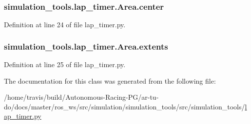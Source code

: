 \subsubsection[{\texorpdfstring{center}{center}}]{\setlength{\rightskip}{0pt plus 5cm}simulation\+\_\+tools.\+lap\+\_\+timer.\+Area.\+center}\hypertarget{classsimulation__tools_1_1lap__timer_1_1_area_ab6d54ce6f15f7931e2c97c418ef275ec}{}\label{classsimulation__tools_1_1lap__timer_1_1_area_ab6d54ce6f15f7931e2c97c418ef275ec}


Definition at line 24 of file lap\+\_\+timer.\+py.

\subsubsection[{\texorpdfstring{extents}{extents}}]{\setlength{\rightskip}{0pt plus 5cm}simulation\+\_\+tools.\+lap\+\_\+timer.\+Area.\+extents}\hypertarget{classsimulation__tools_1_1lap__timer_1_1_area_a5a876b3d7c79ddb803e0e66d851c8c4d}{}\label{classsimulation__tools_1_1lap__timer_1_1_area_a5a876b3d7c79ddb803e0e66d851c8c4d}


Definition at line 25 of file lap\+\_\+timer.\+py.



The documentation for this class was generated from the following file\+:\begin{DoxyCompactItemize}
\item 
/home/travis/build/\+Autonomous-\/\+Racing-\/\+P\+G/ar-\/tu-\/do/docs/master/ros\+\_\+ws/src/simulation/simulation\+\_\+tools/src/simulation\+\_\+tools/\hyperlink{lap__timer_8py}{lap\+\_\+timer.\+py}\end{DoxyCompactItemize}
